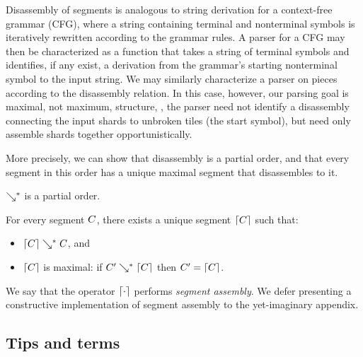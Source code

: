 Disassembly of segments is analogous to string derivation for a
context-free grammar (CFG),
where a string containing terminal and nonterminal symbols is iteratively
rewritten according to the grammar rules.
A parser for a CFG may then be characterized as a function
that takes a string of terminal symbols and identifies,
if any exist,
a derivation from the grammar's starting nonterminal
symbol to the input string.
We may similarly characterize a parser on pieces according
to the disassembly relation.
In this case, however, our parsing goal is maximal,
not maximum, structure, \ie, the parser
need not identify a disassembly connecting the input
shards to unbroken tiles (the start symbol), but need only assemble shards
together opportunistically.

More precisely, we can show that disassembly is a
partial order, and that every segment in this order
has a unique maximal segment that disassembles to it.
\begin{lemma}
  $\searrow^*$ is a partial order.
\end{lemma}
\begin{lemma}\label{lemma:unique-parsed-selection}
  For every segment $C$, there exists a unique
  segment $\left\lceil C\right\rceil$ such that:
  \begin{itemize}
  \item $\left\lceil C\right\rceil\searrow^*C$, and
  \item $\left\lceil C\right\rceil$ is maximal: if $C'\searrow^*\left\lceil C\right\rceil$ then $C' = \left\lceil C\right\rceil$.
  \end{itemize}
\end{lemma}
\noindent
We say that the operator $\left\lceil\cdot\right\rceil$ performs \emph{segment assembly}.
We defer presenting a constructive implementation of segment
assembly to the yet-imaginary appendix.



\subsection{Tips and terms} \label{sec:tips-and-terms}


